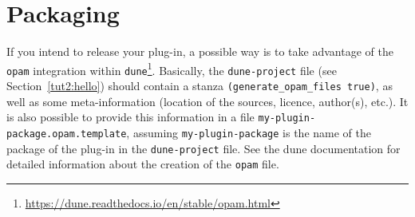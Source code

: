 







\section{Packaging}
\label{sec:dune-packaging}

If you intend to release your plug-in, a possible way is to take advantage of
the \texttt{opam} integration within
\texttt{dune}\footnote{\url{https://dune.readthedocs.io/en/stable/opam.html}}.
Basically, the \texttt{dune-project} file
(see Section~\ref{tut2:hello}) should contain a stanza
\texttt{(generate\_opam\_files true)}, as well as some meta-information
(location of the sources, licence, author(s), etc.). It is also possible to
provide this information in a file \texttt{my-plugin-package.opam.template},
assuming \texttt{my-plugin-package} is the name of the package of the plug-in in
the \texttt{dune-project} file. See the dune documentation for detailed information
about the creation of the \texttt{opam} file.

